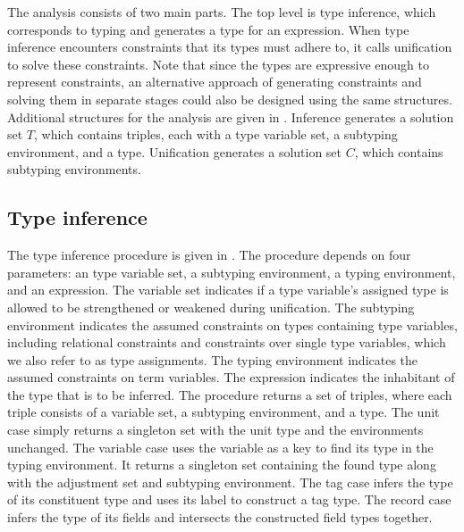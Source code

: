\documentclass[acmsmall]{acmart}
\theoremstyle{definition}
\begin{document}
The analysis consists of two main parts. The top level is type inference, which corresponds to typing
and generates a type for an expression. When type inference encounters constraints that its types must adhere to,
it calls unification to solve these constraints. Note that since the types are expressive enough to represent constraints,
an alternative approach of generating constraints and solving them in separate stages could also be designed 
using the same structures. Additional structures for the analysis are given in . 
Inference generates a solution set $T$, which contains triples, each with a type variable set, a subtyping environment, and a type.  
Unification generates a solution set $C$, which contains subtyping environments. 



\subsection{Type inference}
The type inference procedure is given in .
The procedure depends on four parameters: an type variable set, a subtyping environment, 
a typing environment, and an expression.
The variable set indicates if a type variable's assigned type is allowed to be strengthened or weakened  
during unification.
The subtyping environment indicates the assumed constraints on types containing type variables,
including relational constraints and constraints over single type variables, 
which we also refer to as type assignments.
The typing environment indicates the assumed constraints on term variables.
The expression indicates the inhabitant of the type that is to be inferred.
The procedure returns a set of triples, where each triple consists of a variable set, a subtyping environment,
and a type.
The unit case simply returns a singleton set with the unit type and the environments unchanged. 
The variable case uses the variable as a key to find its type in the typing environment. 
It returns a singleton set containing the found type along with the adjustment set and subtyping environment.
The tag case infers the type of its constituent type and uses its label to construct a tag type.
The record case infers the type of its fields and intersects the constructed field types together.
\end{document}
